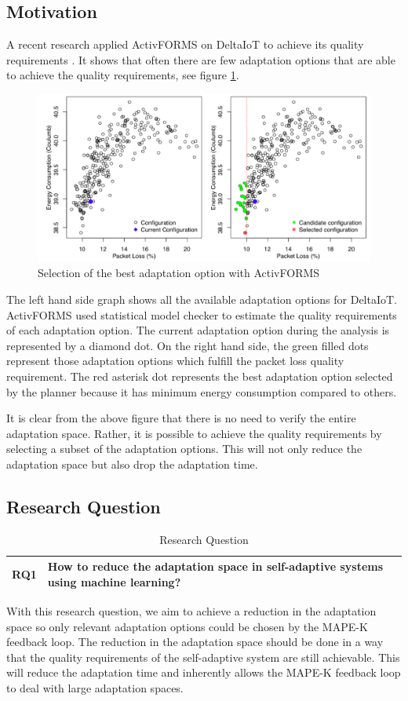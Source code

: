 \documentclass[a4paper,12pt]{article}
\begin{document}
\subsection{Motivation}
A recent research applied ActivFORMS on DeltaIoT to achieve its quality requirements \cite{AMBATESASWG-2017}. It shows that often there are few adaptation options that are able to achieve the quality requirements, see figure \ref{DeltaIoT-ActivFORMS}. 
\begin{figure}[H]
	\centering
	\includegraphics[keepaspectratio, width=\linewidth]{graphs/DeltaIoT-ActivFORMS.png}
	\caption{Selection of the best adaptation option with ActivFORMS \cite{AMBATESASWG-2017}}
	\label{DeltaIoT-ActivFORMS}
\end{figure}
The left hand side graph shows all the available adaptation options for DeltaIoT. ActivFORMS used statistical model checker to estimate the quality requirements of each adaptation option. The current adaptation option during the analysis is represented by a diamond dot. On the right hand side, the green filled dots represent those adaptation options which fulfill the packet loss quality requirement. The red asterisk dot represents the best adaptation option selected by the planner because it has minimum energy consumption compared to others.

It is clear from the above figure that there is no need to verify the entire adaptation space. Rather, it is possible to achieve the quality requirements by selecting a subset of the adaptation options. This will not only reduce the adaptation space but also drop the adaptation time.
\subsection{Research Question}
\begin{table}[H]
	\centering
	\begin{tabular}{|p{1cm}|p{11cm}|}
		\hline
		\textbf{RQ1} & How to reduce the adaptation space in self-adaptive systems using machine learning? \\
		\hline
	\end{tabular}
	\caption{Research Question}
\end{table}
With this research question, we aim to achieve a reduction in the adaptation space so only relevant adaptation options could be chosen by the MAPE-K feedback loop. The reduction in the adaptation space should be done in a way that the quality requirements of the self-adaptive system are still achievable. This will reduce the adaptation time and inherently allows the MAPE-K feedback loop to deal with large adaptation spaces.
\end{document}
